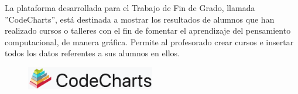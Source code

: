 
La plataforma desarrollada para el Trabajo de Fin de Grado, llamada ''CodeCharts'', está destinada a mostrar los resultados de alumnos que han realizado cursos o talleres con el fin de fomentar el aprendizaje del pensamiento computacional, de manera gráfica.
Permite al profesorado crear cursos e insertar todos los datos referentes a sus alumnos en ellos.

\begin{figure}[!th]
\begin{center}
\includegraphics[width=0.5\textwidth]{images/logo_plataforma.eps}
\label{fig:9}
\end{center}
\end{figure}


